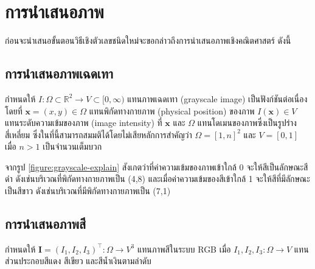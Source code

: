 \section{การนำเสนอภาพ}

\hspace{1cm} ก่อนจะนำเสนอขั้นตอนวิธีเชิงตัวเลขชนิดใหม่จะขอกล่าวถึงการนำเสนอภาพเชิงคณิตศาสตร์ ดังนี้

\subsection{การนำเสนอภาพเฉดเทา}

\hspace{1cm} กำหนดให้ $I : \Omega \subset \mathbb{R}^2 \rightarrow V \subset [0,\infty)$ แทนภาพเฉดเทา (grayscale image)  เป็นฟังก์ชันต่อเนื่อง โดยที่ $ \mathbf{x} = (x,y) \in \Omega $ แทนพิกัดทางกายภาพ (physical position) ของภาพ $ I(\mathbf{x}) \in V $ แทนระดับความเข้มของภาพ (image intensity) ที่ $ \mathbf{x} $ และ $ \Omega $ แทนโดเมนของภาพซึ่งเป็นรูปร่างสี่เหลี่ยม ซึ่งในที่นี้สามารถสมมติได้โดยไม่เสียหลักการสำคัญว่า $ \Omega = [1,n]^2 $ และ $ V = [0,1] $ เมื่อ $n>1$ เป็นจำนวนเต็มบวก 



\hspace{1cm} จากรูป \ref{figure:grayscale-explain} สังเกตว่าที่ค่าความเข้มของภาพเข้าใกล้ 0 จะให้สีเป็นลักษณะสีดำ ดังเช่นบริเวณที่พิกัดทางกายภาพเป็น (4,8) และเมื่อค่าความเข้มของสีเข้าใกล้ 1 จะให้สีที่มีลักษณะเป็นสีขาว ดังเช่นบริเวณที่มีพิกัดทางกายภาพเป็น (7,1)

\subsection{การนำเสนอภาพสี}

\hspace{1cm} กำหนดให้ $ \boldsymbol{I} = (I_1,I_2,I_3)^{\top} : \Omega  \rightarrow V^3 $ แทนภาพสีในระบบ RGB เมื่อ $I_1,I_2,I_3: \Omega  \rightarrow V$ แทนส่วนประกอบสีแดง สีเขียว และสีน้ำเงินตามลำดับ

